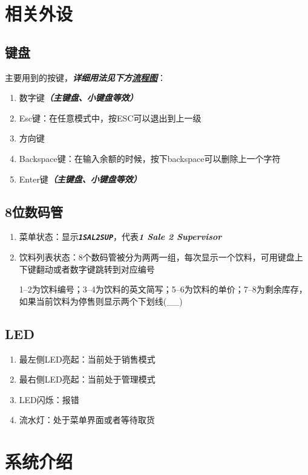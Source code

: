 \documentclass{article}
\begin{document}
\newpage
\section{相关外设}
\subsection{键盘}
主要用到的按键，\textbf{\textit{详细用法见下方\hyperref[sec:states_diagram]{流程图}}}：
\begin{enumerate}
	\item 数字键\textbf{\textit{（主键盘、小键盘等效）}}
	\item Esc键：在任意模式中，按ESC可以退出到上一级
	\item 方向键
	\item Backspace键：在输入余额的时候，按下backspace可以删除上一个字符
	\item Enter键\textbf{\textit{（主键盘、小键盘等效）}}
\end{enumerate}

\subsection{8位数码管}
\begin{enumerate}
	\item 菜单状态：显示\textbf{\textit{\texttt{1SAL2SUP}}}，代表\textbf{\textit{1 Sale 2 Supervisor}}
	\item 饮料列表状态：8个数码管被分为两两一组，每次显示一个饮料，可用键盘上下键翻动或者数字键跳转到对应编号

		1--2为饮料编号；3--4为饮料的英文简写；5--6为饮料的单价；7--8为剩余库存，如果当前饮料为停售则显示两个下划线(\_\_)
\end{enumerate}

\subsection{LED}
\begin{enumerate}
	\item 最左侧LED亮起：当前处于销售模式
	\item 最右侧LED亮起：当前处于管理模式
	\item LED闪烁：报错
	\item 流水灯：处于菜单界面或者等待取货
\end{enumerate}

\section{系统介绍}
\label{sec:system}
\end{document}
